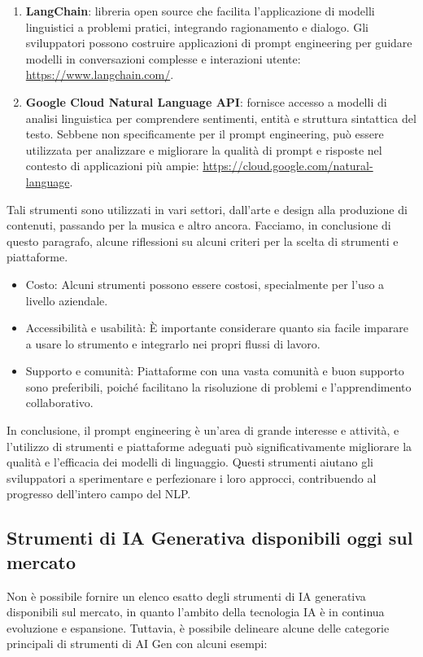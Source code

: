 \begin{enumerate}
            \item \textbf{LangChain}: libreria open source che facilita l'applicazione di modelli linguistici a problemi pratici, integrando ragionamento e dialogo. Gli sviluppatori possono costruire applicazioni di prompt engineering per guidare modelli in conversazioni complesse e interazioni utente: \url{https://www.langchain.com/}.

            \item \textbf{Google Cloud Natural Language API}: fornisce accesso a modelli di analisi linguistica per comprendere sentimenti, entità e struttura sintattica del testo. Sebbene non specificamente per il prompt engineering, può essere utilizzata per analizzare e migliorare la qualità di prompt e risposte nel contesto di applicazioni più ampie: \url{https://cloud.google.com/natural-language}.
        \end{enumerate}

        Tali strumenti sono utilizzati in vari settori, dall'arte e design alla produzione di contenuti, passando per la musica e altro ancora. Facciamo, in conclusione di questo paragrafo, alcune riflessioni su alcuni criteri per la scelta di strumenti e piattaforme.

        \begin{itemize}
            \item Costo: Alcuni strumenti possono essere costosi, specialmente per l'uso a livello aziendale.
            \item Accessibilità e usabilità: È importante considerare quanto sia facile imparare a usare lo strumento e integrarlo nei propri flussi di lavoro.
            \item Supporto e comunità: Piattaforme con una vasta comunità e buon supporto sono preferibili, poiché facilitano la risoluzione di problemi e l'apprendimento collaborativo.
        \end{itemize}

        In conclusione, il prompt engineering è un'area di grande interesse e attività, e l'utilizzo di strumenti e piattaforme adeguati può significativamente migliorare la qualità e l'efficacia dei modelli di linguaggio. Questi strumenti aiutano gli sviluppatori a sperimentare e perfezionare i loro approcci, contribuendo al progresso dell'intero campo del NLP.
        
    \subsection{Strumenti di IA Generativa disponibili oggi sul mercato}
        Non è possibile fornire un elenco esatto degli strumenti di IA generativa disponibili sul mercato, in quanto l'ambito della tecnologia IA è in continua evoluzione e espansione. Tuttavia, è possibile delineare alcune delle categorie principali di strumenti di AI Gen con alcuni esempi:

